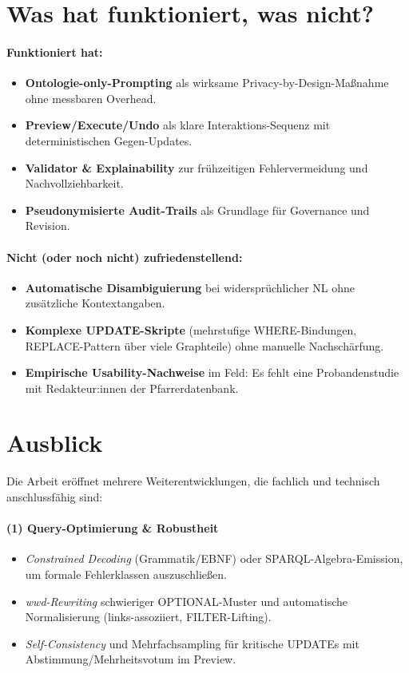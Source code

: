 \section{Was hat funktioniert, was nicht?}
\paragraph{Funktioniert hat:}
\begin{itemize}
  \item \textbf{Ontologie-only-Prompting} als wirksame Privacy-by-Design-Maßnahme ohne messbaren Overhead.
  \item \textbf{Preview/Execute/Undo} als klare Interaktions-Sequenz mit deterministischen Gegen-Updates.
  \item \textbf{Validator \& Explainability} zur frühzeitigen Fehlervermeidung und Nachvollziehbarkeit.
  \item \textbf{Pseudonymisierte Audit-Trails} als Grundlage für Governance und Revision.
\end{itemize}
\paragraph{Nicht (oder noch nicht) zufriedenstellend:}
\begin{itemize}
  \item \textbf{Automatische Disambiguierung} bei widersprüchlicher NL ohne zusätzliche Kontextangaben.
  \item \textbf{Komplexe UPDATE-Skripte} (mehrstufige WHERE-Bindungen, REPLACE-Pattern über viele Graphteile) ohne manuelle Nachschärfung.
  \item \textbf{Empirische Usability-Nachweise} im Feld: Es fehlt eine Probandenstudie mit Redakteur:innen der Pfarrerdatenbank.
\end{itemize}

\section{Ausblick}
Die Arbeit eröffnet mehrere Weiterentwicklungen, die fachlich und technisch anschlussfähig sind:

\paragraph{(1) Query-Optimierung \& Robustheit}
\begin{itemize}
  \item \emph{Constrained Decoding} (Grammatik/EBNF) oder SPARQL-Algebra-Emission, um formale Fehlerklassen auszuschließen.
  \item \emph{wwd-Rewriting} schwieriger OPTIONAL-Muster und automatische Normalisierung (links-assoziiert, FILTER-Lifting).
  \item \emph{Self-Consistency} und Mehrfachsampling für kritische UPDATEs mit Abstimmung/Mehrheitsvotum im Preview.
\end{itemize}

